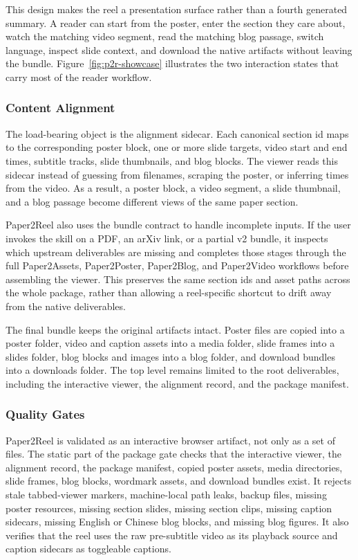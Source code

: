 \documentclass{article}
\begin{document}
This design makes the reel a presentation surface rather than a fourth generated summary. A reader can start from the poster, enter the section they care about, watch the matching video segment, read the matching blog passage, switch language, inspect slide context, and download the native artifacts without leaving the bundle.
Figure~\ref{fig:p2r-showcase} illustrates the two interaction states that carry most of the reader workflow.

\subsubsection{Content Alignment}

The load-bearing object is the alignment sidecar. Each canonical section id maps to the corresponding poster block, one or more slide targets, video start and end times, subtitle tracks, slide thumbnails, and blog blocks. The viewer reads this sidecar instead of guessing from filenames, scraping the poster, or inferring times from the video. As a result, a poster block, a video segment, a slide thumbnail, and a blog passage become different views of the same paper section.

Paper2Reel also uses the bundle contract to handle incomplete inputs. If the user invokes the skill on a PDF, an arXiv link, or a partial v2 bundle, it inspects which upstream deliverables are missing and completes those stages through the full Paper2Assets, Paper2Poster, Paper2Blog, and Paper2Video workflows before assembling the viewer. This preserves the same section ids and asset paths across the whole package, rather than allowing a reel-specific shortcut to drift away from the native deliverables.

The final bundle keeps the original artifacts intact. Poster files are copied into a poster folder, video and caption assets into a media folder, slide frames into a slides folder, blog blocks and images into a blog folder, and download bundles into a downloads folder. The top level remains limited to the root deliverables, including the interactive viewer, the alignment record, and the package manifest.

\subsubsection{Quality Gates}

Paper2Reel is validated as an interactive browser artifact, not only as a set of files. The static part of the package gate checks that the interactive viewer, the alignment record, the package manifest, copied poster assets, media directories, slide frames, blog blocks, wordmark assets, and download bundles exist. It rejects stale tabbed-viewer markers, machine-local path leaks, backup files, missing poster resources, missing section slides, missing section clips, missing caption sidecars, missing English or Chinese blog blocks, and missing blog figures. It also verifies that the reel uses the raw pre-subtitle video as its playback source and caption sidecars as toggleable captions.
\end{document}
